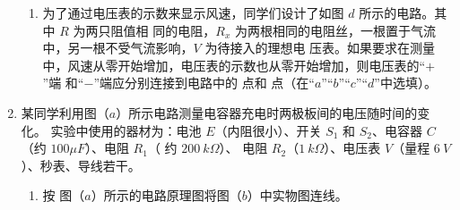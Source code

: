 \begin{enumerate}
\begin{enumerate}
\item 
为了通过电压表的示数来显示风速，同学们设计了如图 $ d $ 所示的电路。其中 $ R $ 为两只阻值相
同的电阻，$ R_{x} $ 为两根相同的电阻丝，一根置于气流中，另一根不受气流影响，$ V $ 为待接入的理想电
压表。如果要求在测量中，风速从零开始增加，电压表的示数也从零开始增加，则电压表的“$ + $”端
和“$ - $”端应分别连接到电路中的
\underlinegap 
点和
\underlinegap 
点（在“$ a $”“$ b $”“$ c $”“$ d $”中选填）。	
\end{enumerate}




\item 
{}
某同学利用图（$ a $）所示电路测量电容器充电时两极板间的电压随时间的变化。
实验中使用的器材为：电池 $ E $（内阻很小）、开关 $ S_{1} $ 和 $ S_{2} $、电容器 $ C $（约 $ 100 \mu F $）、电阻 $ R_{1} $（
约 $ 200 \ k\Omega $）、
电阻 $ R_{2} $（$ 1 \ k\Omega $）、电压表 $ V $（量程 $ 6 \ V $）、秒表、导线若干。
\begin{figure}[h!]
\centering
\begin{subfigure}{0.4\linewidth}
\centering
 
\caption{}\label{}
\end{subfigure}
\begin{subfigure}{0.4\linewidth}
\centering
 
\caption{}\label{}
\end{subfigure}
\begin{subfigure}{0.4\linewidth}
\centering
 
\caption{}\label{}
\end{subfigure}
\end{figure}

\begin{enumerate}
\item
按 图（$ a $）所示的电路原理图将图（$ b $）中实物图连线。


\end{enumerate}
\end{enumerate}
